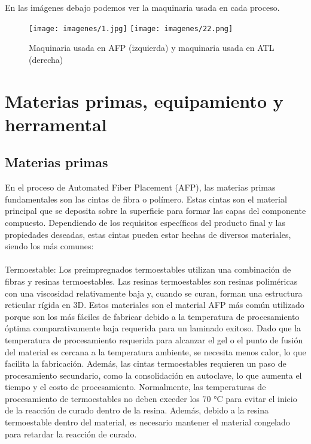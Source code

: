 En las imágenes debajo podemos ver la maquinaria usada en cada proceso.


\begin{figure}[H]
\begin{center}
\texttt{[image: imagenes/1.jpg]}
\texttt{[image: imagenes/22.png]}
\caption{Maquinaria usada en AFP (izquierda) y maquinaria usada en ATL (derecha)}
\label{afp}
\end{center}
\end{figure}

\chapter{Materias primas, equipamiento y herramental}
\label{introduccion}
\section{Materias primas}
En el proceso de Automated Fiber Placement (AFP), las materias primas fundamentales son las cintas de fibra o polímero. Estas cintas son el material principal que se deposita sobre la superficie para formar las capas del componente compuesto. Dependiendo de los requisitos específicos del producto final y las propiedades deseadas, estas cintas pueden estar hechas de diversos materiales, siendo los más comunes:\\\\
Termoestable:
Los preimpregnados termoestables utilizan una combinación de fibras y resinas termoestables. Las resinas termoestables son resinas poliméricas con una viscosidad relativamente baja y, cuando se curan, forman una estructura reticular rígida en 3D. Estos materiales son el material AFP más común utilizado porque son los más fáciles de fabricar debido a la temperatura de procesamiento óptima comparativamente baja requerida para un laminado exitoso. Dado que la temperatura de procesamiento requerida para alcanzar el gel o el punto de fusión del material es cercana a la temperatura ambiente, se necesita menos calor, lo que facilita la fabricación. Además, las cintas termoestables requieren un paso de procesamiento secundario, como la consolidación en autoclave, lo que aumenta el tiempo y el costo de procesamiento. Normalmente, las temperaturas de procesamiento de termoestables no deben exceder los 70 °C para evitar el inicio de la reacción de curado dentro de la resina. Además, debido a la resina termoestable dentro del material, es necesario mantener el material congelado para retardar la reacción de curado.\\

